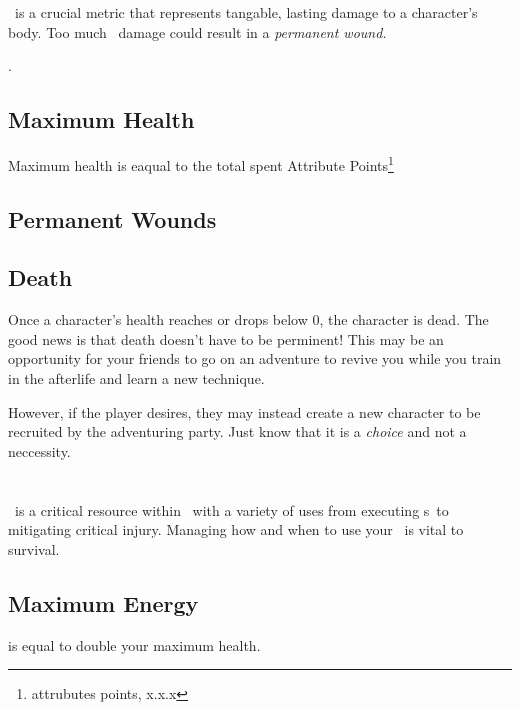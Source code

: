 \HPful\ is a crucial metric that represents tangable, lasting damage
to a character's body. Too much \HPful\ damage could result in a
\textit{permanent wound.}

.

\subsection{Maximum Health }

Maximum health is eaqual to the total spent Attribute Points\footnote{attrubutes points, x.x.x}

\subsection{Permanent Wounds}

\subsection{Death}

Once a character's health reaches or drops below 0, the character
is dead. The good news is that death doesn't have to be perminent!
This may be an opportunity for your friends to go on an adventure
to revive you while you train in the afterlife and learn a new technique.

However, if the player desires, they may instead create a new character
to be recruited by the adventuring party. Just know that it is a \emph{choice}
and not a neccessity.

\section{\ENful{}}

\ENful\ is a critical resource within \gametitlemini\ with a variety
of uses from executing \techn s\  to mitigating critical injury.
Managing how and when to use your \ENful\ is vital to survival.

\subsection{Maximum Energy }

is equal to double your maximum health. 

